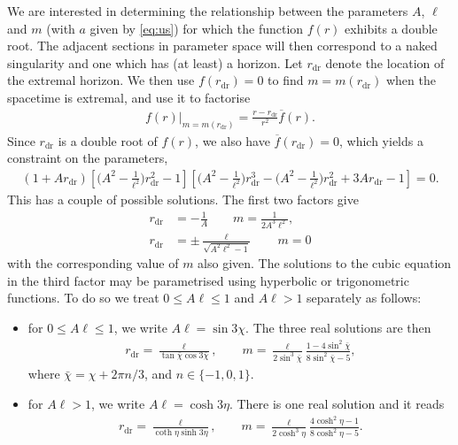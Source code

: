 \documentclass[
twoside,
openright,
frontopenright,
]{dmathesis}
\newcommand{\nn}{\nonumber}
\newcommand{\dr}{\mathrm{dr}}
\begin{document}
We are interested in determining the relationship between the parameters $A$,
$\ell$ and $m$ (with $a$ given by \cref{eq:us}) for which the function $f(r)$
exhibits a double root. The adjacent sections in parameter space will then
correspond to a naked singularity and one which has (at least) a horizon. Let
$r_\dr$ denote the location of the extremal horizon. We then use $f(r_\dr)=0$ to
find $m=m(r_\dr)$ when the spacetime is extremal, and use it to factorise
\begin{align}
f(r)\big|_{m=m(r_\dr)}=\frac{r-r_\dr}{r^2}\overline{f}(r).
\end{align}
Since $r_\dr$ is a double root of $f(r)$, we also have $\overline{f}(r_\dr)=0$,
which yields a constraint on the parameters,
\begin{align}
 (1+Ar_\dr)\left[\Big(A^{2}-\frac{1}{\ell^2}\Big)r_\dr^2-1\right]\left[\Big(A^2-\frac{1}{\ell^2}\Big)r_\dr^3-\Big(A^2-\frac{1}{\ell^2}\Big)r_\dr^2+3Ar_\dr-1\right]=0.
\end{align}
This has a couple of possible solutions. The first two factors give
\begin{align}
r_\dr &=- \frac{1}{A} \qquad m = \frac{1}{2A^3\ell^2},\nn\\
r_\dr &= \pm\frac{\ell}{\sqrt{A^2\ell^2-1}}\qquad m =0
\end{align}
with the corresponding value of $m$ also given. The solutions to the cubic
equation in the third factor may be parametrised using hyperbolic or
trigonometric functions. To do so we treat $0\leqslant A\ell\leqslant 1$ and
$A\ell>1$ separately as follows:

\begin{itemize}
\item for $0\leqslant A\ell \leqslant 1$, we write $A\ell=\sin 3\chi$. The three
  real solutions are then
\begin{align}
r_\dr = \frac{\ell}{\tan\bar{\chi}\cos3\bar{\chi}}, \qquad m =
  \frac{\ell}{2\sin^3\bar{\chi}}\frac{1-4\sin^2\bar{\chi}}{8\sin^2\bar{\chi}-5},
\end{align}
where $\bar{\chi} = \chi + 2\pi n/3$, and $n \in \{-1,0,1\}$.
\item for $A\ell > 1$, we write $A\ell=\cosh 3\eta$. There is one real solution
  and it reads
\begin{align}
r_\dr = \frac{\ell}{\coth\eta\sinh 3\eta}, \qquad m =
  \frac{\ell}{2\cosh^3\eta}\frac{4\cosh^2\eta-1}{8\cosh^2\eta-5}. 
\end{align}
\end{itemize}
\end{document}
